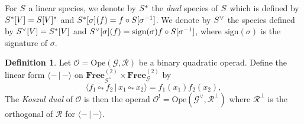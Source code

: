 \documentclass[11pt]{article}
\theoremstyle{definition}
\newtheorem{defi}[theo]{Definition}
\numberwithin{equation}{section}
\newcommand{\spe}[1]{\normalfont{\textsc{#1}}}
\newcommand{\op}[1]{\mathbf{#1}}
\newcommand{\comp}[1][\ast]{\circ_{#1}}
\newcommand{\sign}{\text{sign}}
\newcommand{\scalar}[2]{\langle #1 \,|\, #2\rangle}
\newcommand{\Operad}{\mathcal{O}}
\newcommand{\free}[1]{\op{Free}_{#1}}
\newcommand{\Ope}{\mathrm{Ope}}
\begin{document}
For $\spe{S}$ a linear species, we denote by $\spe{S}^*$ the {\em dual} species of $\spe{S}$ which is defined by $\spe{S}^*[V]=\spe{S}[V]^*$ and 
$\spe{S}^*[\sigma](f) = f\circ\spe{S}[\sigma^{-1}]$. We denote by $\spe{S}^\vee$ the species defined by $\spe{S}^\vee[V]=\spe{S}^*[V]$ and
$\spe{S}^\vee[\sigma](f) = \sign(\sigma)f\circ\spe{S}[\sigma^{-1}]$, where $\sign(\sigma)$ is the signature of $\sigma$. 

\begin{defi}
    Let $\Operad =\Ope(\mathcal{G},\mathcal{R})$ be a binary quadratic operad. Define the linear form $\scalar{ -}{ -}$ on 
    $\free{\mathcal{G}^{\vee}}^{(2)}\times\free{\mathcal{G}}^{(2)}$ by
    \begin{equation}
        \scalar{f_1\comp f_2}{x_1\comp x_2} = f_1(x_1)f_2(x_2),
    \end{equation}
    The {\em Koszul dual} of $\Operad$ is then the operad $\Operad^!=\Ope(\mathcal{G}^{\vee},\mathcal{R}^{\bot})$
    where $\mathcal{R}^{\bot}$ is the orthogonal of $\mathcal{R}$ for $\scalar{-}{-}$.
\end{defi}
\end{document}
